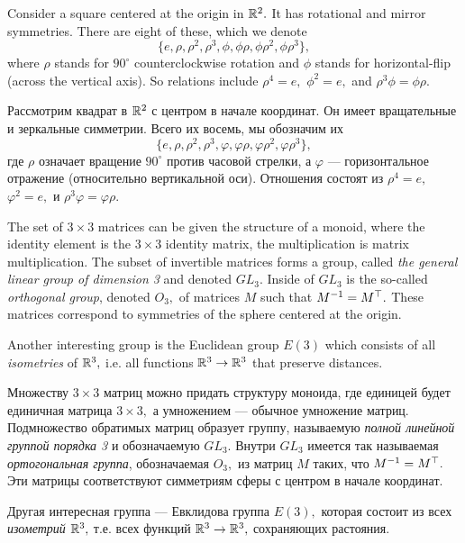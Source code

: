 \documentclass[../main/CT4S-EN-RU]{subfiles}
\begin{document}
\begin{exampleENG}
Consider a square centered at the origin in ${\mathbb R}^2.$ It has rotational and mirror symmetries. There are eight of these, which we denote $$\{e,\rho,\rho^2,\rho^3,\phi,\phi\rho,\phi\rho^2,\phi\rho^3\},$$ where $\rho$ stands for $90^\circ$ counterclockwise rotation and $\phi$ stands for horizontal-flip (across the vertical axis). So relations include $\rho^4=e,$ $\phi^2=e,$ and $\rho^3\phi=\phi\rho.$
\end{exampleENG}

\begin{exampleRUS}
Рассмотрим квадрат в ${\mathbb R}^2$ с центром в начале координат. Он имеет вращательные и зеркальные симметрии. Всего их восемь, мы обозначим их $$\{e,\rho,\rho^2,\rho^3,\varphi,\varphi\rho,\varphi\rho^2,\varphi\rho^3\},$$ где $\rho$ означает вращение $90^\circ$ против часовой стрелки, а $\varphi$ — горизонтальное отражение (относительно вертикальной оси). Отношения состоят из $\rho^4=e,$ $\varphi^2=e,$ и $\rho^3\varphi=\varphi\rho.$
\end{exampleRUS}

\begin{exampleENG}\label{ex:important groups}
The set of $3\times 3$ matrices can be given the structure of a monoid, where the identity element is the $3\times 3$ identity matrix, the multiplication is matrix multiplication. The subset of invertible matrices forms a group, called {\em the general linear group of dimension 3} and denoted $GL_3.$ Inside of $GL_3$ is the so-called {\em orthogonal group}, denoted $O_3,$ of matrices $M$ such that $M^\m1=M^\top.$ These matrices correspond to symmetries of the sphere centered at the origin.

Another interesting group is the Euclidean group $E(3)$ which consists of all {\em isometries} of ${\mathbb R}^3,$ i.e. all functions ${\mathbb R}^3\rightarrow{\mathbb R}^3$ that preserve distances.  
\end{exampleENG}

\begin{exampleRUS}\label{ex:important groups}
Множеству $3\times 3$ матриц можно придать структуру моноида, где единицей будет единичная матрица $3\times 3,$ а умножением — обычное умножение матриц. Подмножество обратимых матриц образует группу, называемую {\em полной линейной группой порядка 3} и обозначаемую $GL_3.$ Внутри $GL_3$ имеется так называемая {\em ортогональная группа}, обозначаемая $O_3,$ из матриц $M$ таких, что $M^\m1=M^\top.$ Эти матрицы соответствуют симметриям сферы с центром в начале координат.

Другая интересная группа — Евклидова группа $E(3),$ которая состоит из всех {\em изометрий} ${\mathbb R}^3,$ т.е. всех функций ${\mathbb R}^3\rightarrow{\mathbb R}^3,$ сохраняющих растояния.  
\end{exampleRUS}
\end{document}
